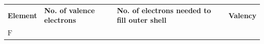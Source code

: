 \begin{enumerate}[noitemsep, label=\textbf{\arabic*}. ]
{{    \addtocounter{footnote}{-0}
    
          }{ %
        
    
        \begin{center}
      
      \label{m38704*id139625}
      
    \noindent
      \tablelasttail{}
      \begin{xtabular}[t]{|l|l|l|l|}\hline
    
    
        \textbf{Element} &
    
    
        \textbf{No. of valence electrons} &
    
    
        \textbf{No. of electrons needed to fill outer shell} &
    
    
        \textbf{Valency}%
     \tabularnewline{}
    
    
        \begin{math}\mathrm{F}\end{math} &
    

\end{xtabular}
\end{center}}}
\end{enumerate}
